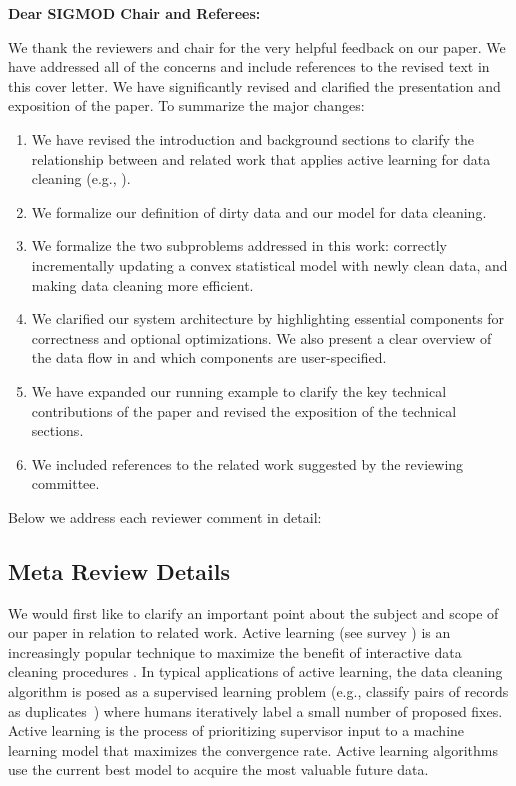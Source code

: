 {\noindent \normalsize \bf Dear SIGMOD Chair and Referees: }

\vspace{.5em}

We thank the reviewers and chair for the very helpful feedback on our paper. We have addressed all of the concerns and include references to the revised text in this cover letter. 
We have significantly revised and clarified the presentation and exposition
of the paper.
To summarize the major changes:
\begin{enumerate}
\item We have revised the introduction and background sections to clarify the relationship between \sys and related work that applies active learning for data cleaning (e.g., \cite{gokhale2014corleone, DBLP:journals/pvldb/YakoutENOI11, yakout2013don}).

\item We formalize our definition of dirty data and our model for data cleaning.

\item We formalize the two subproblems addressed in this work: correctly incrementally updating a convex statistical model with newly clean data, and making data cleaning more efficient.

\item We clarified our system architecture by highlighting essential components for correctness and optional optimizations. We also present a clear overview of the data flow in \sys and which components are user-specified.

\item We have expanded our running example to clarify the key technical contributions of the paper and revised the exposition of the technical sections.

\item We included references to the related work suggested by the reviewing committee.
\end{enumerate}
Below we address each reviewer comment in detail:

\vspace{0.5em}

\subsection*{Meta Review Details} 

We would first like to clarify an important point about the subject and scope of our paper in relation to related work.
Active learning (see survey \cite{settles2010active}) is an increasingly popular technique to maximize the benefit of interactive data cleaning procedures \cite{DBLP:journals/pvldb/YakoutENOI11, gokhale2014corleone, yakout2013don, DBLP:journals/pvldb/HaasKWF015}.
In typical applications of active learning, the data cleaning algorithm is posed as a supervised learning problem (e.g., classify pairs of records as duplicates~\cite{gokhale2014corleone}) where humans iteratively label a small number of proposed fixes.
Active learning is the process of prioritizing supervisor input to a machine learning model that maximizes the convergence rate.
Active learning algorithms use the current best model to acquire the most valuable future data.


